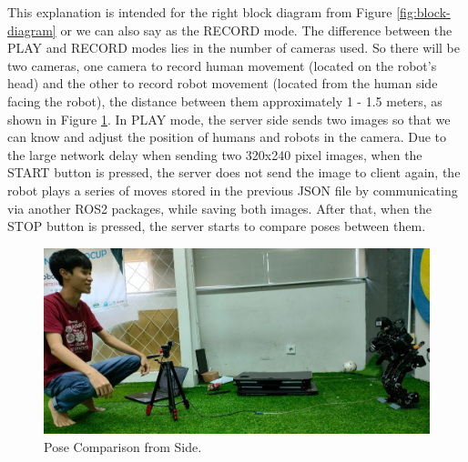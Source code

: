 This explanation is intended for the right block diagram from Figure \ref{fig:block-diagram} or we can also say as the RECORD mode. The difference between the PLAY and RECORD modes lies in the number of cameras used.
So there will be two cameras, one camera to record human movement (located on the robot's head) and the other to record robot movement (located from the human side facing the robot), the distance between them approximately 1 - 1.5 meters, as shown in Figure \ref{fig:pose-comparison-side}.
In PLAY mode, the server side sends two images so that we can know and adjust the position of humans and robots in the camera. Due to the large network delay when sending two 320x240 pixel images, when the START button is pressed,
the server does not send the image to client again, the robot plays a series of moves stored in the previous JSON file by communicating via another ROS2 packages, while saving both images. After that, when the STOP button is pressed, the server starts to compare poses between them.
\begin{figure}[ht]
  \centering
  \includegraphics[scale=0.3]{gambar/pose-comparison.jpeg}
  \caption{Pose Comparison from Side.}
  \label{fig:pose-comparison-side}
\end{figure}

